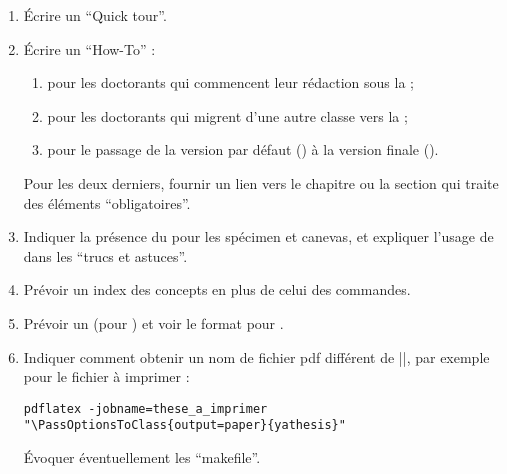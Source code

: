 \begin{enumerate}
\item Écrire un \foreignquote{english}{Quick tour}.
\item Écrire un \foreignquote{english}{How-To} :
  \begin{enumerate}
  \item pour les doctorants qui commencent leur rédaction sous la \yatcl{} ;
  \item pour les doctorants qui migrent d'une autre classe vers la \yatcl{} ;
  \item pour le passage de la version par défaut () à la
    version finale ().
  \end{enumerate}
  Pour les deux derniers, fournir un lien vers le chapitre ou la section qui
  traite des éléments \enquote{obligatoires}.
\item Indiquer la présence du  pour les spécimen et canevas, et
  expliquer l'usage de  dans les \enquote{trucs et astuces}.
\item Prévoir un index des concepts en plus de celui des commandes.
\item Prévoir un  (pour ) et voir le format
  pour .
\item Indiquer comment obtenir un nom de fichier \acrshort{pdf} différent de
  |\jobname|, par exemple pour le fichier à imprimer :
  \lstset{escapechar=}
\begin{lstlisting}
pdflatex -jobname=these_a_imprimer "\PassOptionsToClass{output=paper}{yathesis}"
\end{lstlisting}
  \lstset{escapechar="}%
Évoquer éventuellement les \enquote{makefile}.
\end{enumerate}

%
\iffalse
\fi
